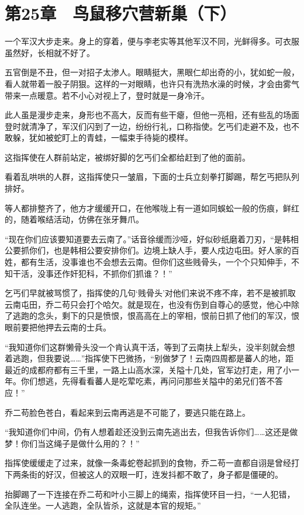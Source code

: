 \section{第25章　鸟鼠移穴营新巢（下）}

一个军汉大步走来。身上的穿着，便与李老实等其他军汉不同，光鲜得多。可衣服虽然好，长相就不好了。

五官倒是不丑，但一对招子太渗人。眼睛挺大，黑眼仁却出奇的小，犹如蛇一般，看人就带着一股子阴狠。这样的一对眼睛，也许只有洗热水澡的时候，才会由雾气带来一点暖意。若不小心对视上了，登时就是一身冷汗。

此人虽是漫步走来，身形也不高大，反而有些干瘪，但他一亮相，还有些乱的场面登时就清净了，军汉们闪到了一边，纷纷行礼，口称指使。乞丐们走避不及，也不敢躲，犹如被蛇盯上的青蛙，一幅束手待毙的模样。

这指挥使在人群前站定，被绑好脚的乞丐们全都给赶到了他的面前。

看着乱哄哄的人群，这指挥使只一皱眉，下面的士兵立刻拳打脚踢，帮乞丐把队列排好。

等人都排整齐了，他方才缓缓开口，在他喉咙上有一道如同蜈蚣一般的伤痕，鲜红的，随着喉结活动，仿佛在张牙舞爪。

“现在你们应该要知道要去云南了。”话音徐缓而沙哑，好似砂纸磨着刀刃，“是韩相公要抓你们，也是韩相公要安排你们。边境上缺人手，要人戍边屯田。好人家的百姓，都有生活，没事谁也不会想去云南。但你们这些贱骨头，一个个只知伸手，不知干活，没事还作奸犯科，不抓你们抓谁？！”

乞丐们早就被骂惯了，指挥使的几句‘贱骨头’对他们来说不疼不痒，若不是被抓取云南屯田，乔二苟只会打个哈欠。就是现在，也没有伤到自尊心的感觉，他心中除了逃跑的念头，剩下的只是愤恨，恨高高在上的宰相，恨前日抓了他们的军汉，恨眼前要把他押去云南的士兵。

“我知道你们这群懒骨头没一个肯认真干活，等到了云南扶上犁头，没半刻就会想着逃跑，但我要说……”指挥使下巴微扬，“别做梦了！云南四周都是蕃人的地，距最近的成都府都有三千里，一路上山高水深，关隘十几处，官军边打走，用了小一年。你们想逃，先得看看蕃人是吃荤吃素，再问问那些关隘中的弟兄们答不答应！”

乔二苟脸色苍白，看起来到云南再逃是不可能了，要逃只能在路上。

“我知道你们中间，仍有人想着趁还没到云南先逃出去，但我告诉你们……这还是做梦！你们当这绳子是做什么用的？！”

指挥使缓缓走了过来，就像一条毒蛇卷起抓到的食物，乔二苟一直都自诩是曾经打下两条街的好汉，但被这人的双眼一盯，连发抖都不敢了，身子都是僵硬的。

抬脚踢了一下连接在乔二苟和叶小三脚上的绳索，指挥使环目一扫，“一人犯错，全队连坐。一人逃跑，全队皆杀，这就是本官的规矩。”

